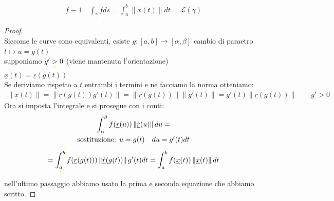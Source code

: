\documentclass[a4paper, oneside]{article}
\begin{document}
\begin{observation}
    \begin{gather*}
        f \equiv 1 \quad \int_{\gamma} f ds = \int_{a}^{b} \left\lVert \dot{x}(t) \right\rVert dt = \mathcal{L}(\gamma)
    \end{gather*}
\end{observation}

\begin{proof}
    \hfil\\
    Siccome le curve sono equivalenti, esiste $g:[a,b] \to [\alpha,\beta]$ cambio di paraetro $t \mapsto u=g(t)$\\
    supponiamo $g'\underset{\textcolor{yellow}{<}}{>}0$ (viene mantenuta l'orientazione)\\
    $\underline{x}(t) = \underline{r}(g(t))$\\
    Se deriviamo rispetto a $t$ entrambi i termini e ne facciamo la norma otteniamo:
    \begin{gather*}
        \left\lVert \underline{\dot{x}}(t)\right\rVert = \left\lVert \underline{\dot{r}}(g(t)) g'(t) \right\rVert = \left\lVert \underline{\dot{r}}(g(t)) \right\rVert \left\lVert g'(t) \right\rVert = g'(t) \left\lVert \underline{\dot{r}}(g(t)) \right\rVert \qquad g'>0    
    \end{gather*}
    Ora si imposta l'integrale e si prosegue con i conti:
    \begin{gather*}
        \int_{\alpha}^{\beta} f(\underline{r}(u)) \left\lVert \underline{\dot{r}}(u) \right\rVert du = \\
        \text{sostituzione: } u=g(t) \quad du = g'(t) dt\\
        = \int_{\underset{\textcolor{yellow}{b}}{a}}^{\overset{\textcolor{yellow}{a}}{b}} f(\underline{r}(g(t))) \left\lVert \underline{\dot{r}}(g(t)) \right\rVert g'(t) dt = \int_{a}^{b} f(\underline{x}(t)) \left\lVert \underline{\dot{x}}(t) \right\rVert dt  
    \end{gather*}
    nell'ultimo passaggio abbiamo usato la prima e seconda equazione che abbiamo scritto.
\end{proof}
\end{document}
